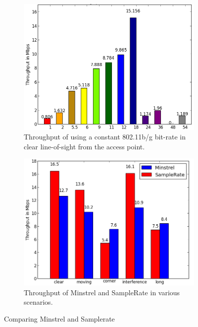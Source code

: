 \documentclass[twocolumn,10pt]{article}
\begin{document}
\begin{figure}[htbp]
  \centering
  \begin{subfigure}{.45\linewidth}
    \includegraphics[width=\linewidth]{constant.png}
    \caption{Throughput of using a constant 802.11b/g bit-rate in
      clear line-of-sight from the access point.}
    \label{figure:2}
  \end{subfigure}\hfill
  \begin{subfigure}{.45\linewidth}
    \includegraphics[width=\linewidth]{MinVSSam1.png}
    \caption{Throughput of Minstrel and SampleRate in various
      scenarios.}
    \label{figure:3}
  \end{subfigure}
  \caption{Comparing Minstrel and Samplerate}
\end{figure}
\end{document}
